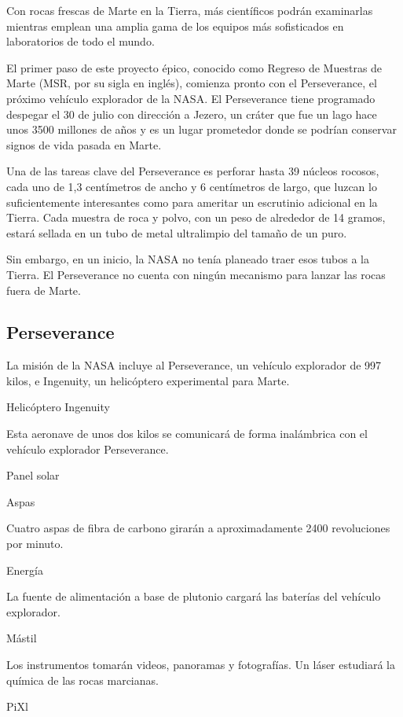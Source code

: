 Con rocas frescas de Marte en la Tierra, más científicos podrán
examinarlas mientras emplean una amplia gama de los equipos más
sofisticados en laboratorios de todo el mundo.

El primer paso de este proyecto épico, conocido como Regreso de Muestras
de Marte (MSR, por su sigla en inglés), comienza pronto con el
Perseverance, el próximo vehículo explorador de la NASA. El Perseverance
tiene programado despegar el 30 de julio con dirección a Jezero, un
cráter que fue un lago hace unos 3500 millones de años y es un lugar
prometedor donde se podrían conservar signos de vida pasada en Marte.

Una de las tareas clave del Perseverance es perforar hasta 39 núcleos
rocosos, cada uno de 1,3 centímetros de ancho y 6 centímetros de largo,
que luzcan lo suficientemente interesantes como para ameritar un
escrutinio adicional en la Tierra. Cada muestra de roca y polvo, con un
peso de alrededor de 14 gramos, estará sellada en un tubo de metal
ultralimpio del tamaño de un puro.

Sin embargo, en un inicio, la NASA no tenía planeado traer esos tubos a
la Tierra. El Perseverance no cuenta con ningún mecanismo para lanzar
las rocas fuera de Marte.

\hypertarget{perseverance}{%
\subsection{Perseverance}\label{perseverance}}

La misión de la NASA incluye al Perseverance, un vehículo explorador de
997 kilos, e Ingenuity, un helicóptero experimental para Marte.

Helicóptero Ingenuity

Esta aeronave de unos dos kilos se comunicará de forma inalámbrica con
el vehículo explorador Perseverance.

Panel solar

Aspas

Cuatro aspas de fibra de carbono girarán a aproximadamente 2400
revoluciones por minuto.

Energía

La fuente de alimentación a base de plutonio cargará las baterías del
vehículo explorador.

Mástil

Los instrumentos tomarán videos, panoramas y fotografías. Un láser
estudiará la química de las rocas marcianas.

PiXl

